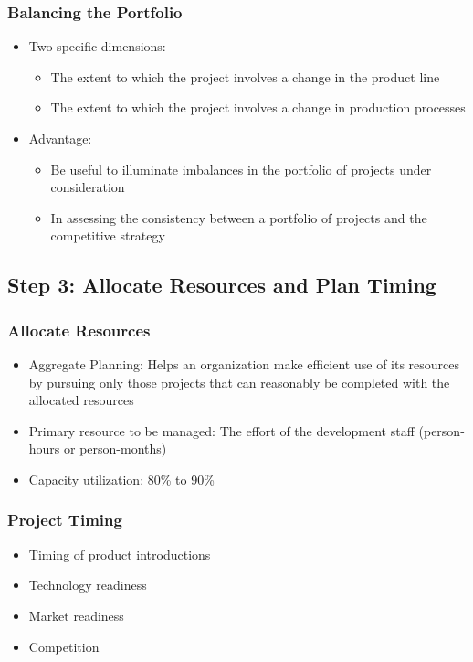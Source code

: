 \documentclass[a4paper,12pt,openany]{book}
\begin{document}
\subsubsection{Balancing the Portfolio}
\begin{itemize}
    \item Two specific dimensions:
    \begin{itemize}
        \item The extent to which the project involves a change in the product line
        \item The extent to which the project involves a change in production processes
    \end{itemize}
    \item Advantage:
    \begin{itemize}
        \item Be useful to illuminate imbalances in the portfolio of projects under consideration 
        \item In assessing the consistency between a portfolio of projects and the competitive strategy
    \end{itemize}
\end{itemize}

\subsection{Step 3: Allocate Resources and Plan Timing}
\subsubsection{Allocate Resources}
\begin{itemize}
    \item Aggregate Planning: Helps an organization make efficient use of its resources by pursuing only those projects that can reasonably be completed with the allocated resources
    \item Primary resource to be managed: The effort of the development staff (person-hours or person-months)
    \item Capacity utilization: 80\% to 90\%
\end{itemize}
\subsubsection{Project Timing}
\begin{itemize}
    \item Timing of product introductions
    \item Technology readiness
    \item Market readiness
    \item Competition
\end{itemize}
\end{document}
